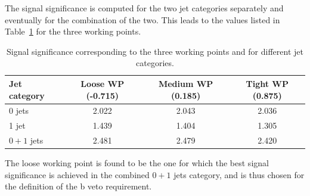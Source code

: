 The signal significance is computed for the two jet categories separately and eventually for the combination of the two. This leads to the values listed in Table~\ref{tab:significance_wp_combine} for the three working points.

\begin{table}
\caption{Signal significance corresponding to the three working points and for
different jet categories.\label{tab:significance_wp_combine}}
\begin{center}
\begin{tabular}{lccc}
\toprule
Jet category & Loose WP (-0.715) & Medium WP (0.185) & Tight WP (0.875) \\
\midrule
0 jets & 2.022 & 2.043 & 2.036 \\
1 jet & 1.439 & 1.404 & 1.305 \\
$0+1$ jets & 2.481 & 2.479 & 2.420 \\
\bottomrule
\end{tabular}
\end{center}
\end{table}

The loose working point is found to be the one for which the best signal significance is achieved in the combined $0+1$ jets category, and is thus chosen for the definition of the b veto requirement.

